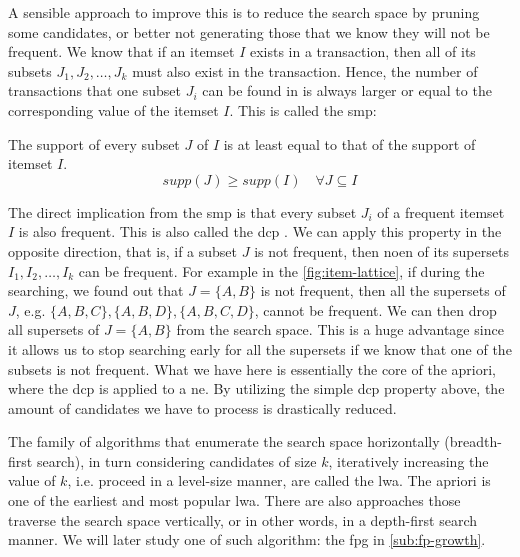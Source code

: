 A sensible approach to improve this is to reduce the search space by pruning some candidates, or better not generating those that we know they will not be frequent.
We know that if an itemset $I$ exists in a transaction, then all of its subsets $J_1, J_2, \dots, J_k$ must also exist in the transaction.
Hence, the number of transactions that one subset $J_i$ can be found in is always larger or equal to the corresponding value of the itemset $I$.
This is called the \acl{smp}:
\begin{definition}
    The support of every subset $J$ of $I$ is at least equal to that of the support of itemset $I$.
    \begin{equation}
        supp(J) \geq supp(I) \quad \forall J \subseteq I
    \end{equation}
\end{definition}

The direct implication from the \acl{smp} is that every subset $J_i$ of a frequent itemset $I$ is also frequent.
This is also called the \acl{dcp} \citep{Aggarwal15}.
We can apply this property in the opposite direction, that is, if a subset $J$ is not frequent, then noen of its supersets $I_1, I_2, \dots, I_k$ can be frequent.
For example in the \autoref{fig:item-lattice}, if during the searching, we found out that $J = \{A, B\}$ is not frequent, then all the supersets of $J$, e.g. $\{A, B, C\}, \{A, B , D\}, \{A, B , C, D\}$, cannot be frequent.
We can then drop all supersets of ${J = \{A, B\}}$ from the search space.
This is a huge advantage since it allows us to stop searching early for all the supersets if we know that one of the subsets is not frequent.
What we have here is essentially the core of the \acl{apriori}, where the \acl{dcp} is applied to a \ac{ne}.
By utilizing the simple \acl{dcp} property above, the amount of candidates we have to process is drastically reduced.


The family of algorithms that enumerate the search space horizontally (breadth-first search), in turn considering candidates of size $k$, iteratively increasing the value of $k$, i.e. proceed in a level-size manner, are called the \acl{lwa}.
The \acl{apriori} is one of the earliest and most popular \acl{lwa}.
There are also approaches those traverse the search space vertically, or in other words, in a depth-first search manner.
We will later study one of such algorithm: the \acl{fpg} in \autoref{sub:fp-growth}.

